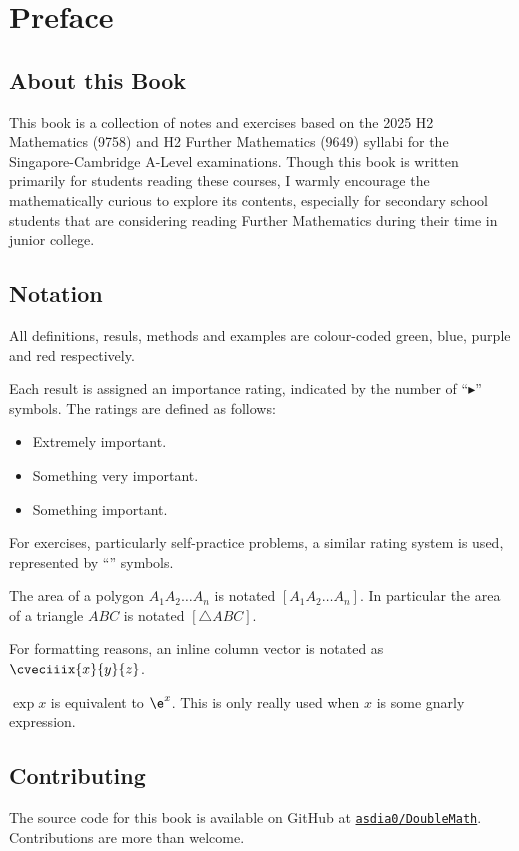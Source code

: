 \chapter*{Preface}

\section*{About this Book}

This book is a collection of notes and exercises based on the 2025 H2 Mathematics (9758) and H2 Further Mathematics (9649) syllabi for the Singapore-Cambridge A-Level examinations. Though this book is written primarily for students reading these courses, I warmly encourage the mathematically curious to explore its contents, especially for secondary school students that are considering reading Further Mathematics during their time in junior college.

\section*{Notation}

All definitions, resuls, methods and examples are colour-coded green, blue, purple and red respectively. 

Each result is assigned an importance rating, indicated by the number of ``$\blacktriangleright$'' symbols. The ratings are defined as follows:
\begin{itemize}
    \item {} Extremely important.
    \item {} Something very important.
    \item {} Something important.
\end{itemize}
For exercises, particularly self-practice problems, a similar rating system is used, represented by ``\chili'' symbols.

The area of a polygon $A_1 A_2 \dots A_n$ is notated $[A_1 A_2 \dots A_n]$. In particular the area of a triangle $ABC$ is notated $[\triangle ABC]$.

For formatting reasons, an inline column vector is notated as $\cveciiix{x}{y}{z}$.

$\exp x$ is equivalent to $\e^{x}$. This is only really used when $x$ is some gnarly expression.

\section*{Contributing}

The source code for this book is available on GitHub at \href{https://github.com/asdia0/DoubleMath}{\texttt{asdia0/DoubleMath}}. Contributions are more than welcome.
